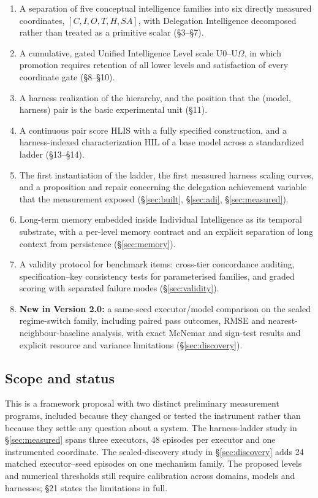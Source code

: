 \documentclass[11pt]{article}
\theoremstyle{definition}
\newcommand{\Om}{\ensuremath{\Omega}}
\begin{document}
\begingroup\sloppy
\begin{enumerate}
\item A separation of five conceptual intelligence families into six directly measured coordinates,
      $[C,I,O,T,H,SA]$, with Delegation Intelligence decomposed rather than treated as a primitive scalar (\S3--\S7).
\item A cumulative, gated Unified Intelligence Level scale U0--U\Om{}, in which promotion requires retention of all lower levels and satisfaction of every coordinate gate (\S8--\S10).
\item A harness realization of the hierarchy, and the position that the (model, harness) pair is the basic experimental unit (\S11).
\item A continuous pair score HLIS with a fully specified construction, and a harness-indexed characterization HIL of a base model across a standardized ladder (\S13--\S14).
\item The first instantiation of the ladder, the first measured harness scaling curves, and a proposition and repair concerning the delegation achievement variable that the measurement exposed (\S\ref{sec:built}, \S\ref{sec:adi}, \S\ref{sec:measured}).
\item Long-term memory embedded inside Individual Intelligence as its temporal substrate, with a per-level memory contract and an explicit separation of long context from persistence (\S\ref{sec:memory}).
\item A validity protocol for benchmark items: cross-tier concordance auditing, specification--key consistency tests for parameterised families, and graded scoring with separated failure modes (\S\ref{sec:validity}).
\item \textbf{New in Version 2.0:} a same-seed executor/model comparison on the sealed regime-switch family, including paired pass outcomes, RMSE and nearest-neighbour-baseline analysis, with exact McNemar and sign-test results and explicit resource and variance limitations (\S\ref{sec:discovery}).
\end{enumerate}
\endgroup

\subsection{Scope and status}

This is a framework proposal with two distinct preliminary measurement programs, included because they changed or tested the instrument rather than because they settle any question about a system. The harness-ladder study in \S\ref{sec:measured} spans three executors, 48 episodes per executor and one instrumented coordinate. The sealed-discovery study in \S\ref{sec:discovery} adds 24 matched executor--seed episodes on one mechanism family. The proposed levels and numerical thresholds still require calibration across domains, models and harnesses; \S21 states the limitations in full.
\end{document}
